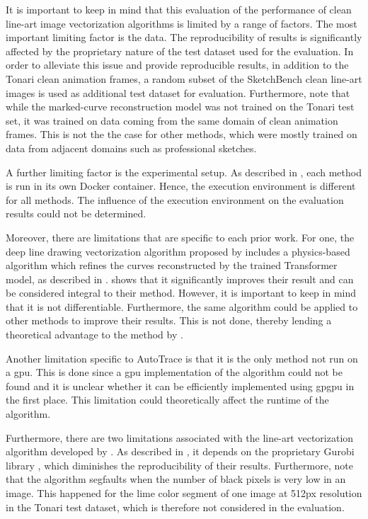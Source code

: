 It is important to keep in mind that this evaluation of the performance of clean line-art image vectorization algorithms is limited by a range of factors. The most important limiting factor is the data. The reproducibility of results is significantly affected by the proprietary nature of the test dataset used for the evaluation. In order to alleviate this issue and provide reproducible results, in addition to the Tonari clean animation frames, a random subset of the SketchBench \citep{Yan:2020:ABR} clean line-art images is used as additional test dataset for evaluation. Furthermore, note that while the marked-curve reconstruction model was not trained on the Tonari test set, it was trained on data coming from the same domain of clean animation frames. This is not the the case for other methods, which were mostly trained on data from adjacent domains such as professional sketches.

A further limiting factor is the experimental setup. As described in , each method is run in its own Docker container. Hence, the execution environment is different for all methods. The influence of the execution environment on the evaluation results could not be determined.

Moreover, there are limitations that are specific to each prior work. For one, the deep line drawing vectorization algorithm proposed by \citet{DBLP:conf/eccv/EgiazarianVAVST20} includes a physics-based algorithm which refines the curves reconstructed by the trained Transformer \citep{DBLP:conf/nips/VaswaniSPUJGKP17} model, as described in .  shows that it significantly improves their result and can be considered integral to their method. However, it is important to keep in mind that it is not differentiable. Furthermore, the same algorithm could be applied to other methods to improve their results. This is not done, thereby lending a theoretical advantage to the method by \citet{DBLP:conf/eccv/EgiazarianVAVST20}.

Another limitation specific to AutoTrace \citep{autotrace} is that it is the only method not run on a \gls{gpu}. This is done since a \gls{gpu} implementation of the algorithm could not be found and it is unclear whether it can be efficiently implemented using \gls{gpgpu} in the first place. This limitation could theoretically affect the runtime of the algorithm.

Furthermore, there are two limitations associated with the line-art vectorization algorithm developed by \citet{Puhachov2021KeypointPolyvector}. As described in , it depends on the proprietary Gurobi library \citep{gurobi}, which diminishes the reproducibility of their results. Furthermore, note that the algorithm segfaults when the number of black pixels is very low in an image. This happened for the lime color segment of one image at 512px resolution in the Tonari test dataset, which is therefore not considered in the evaluation.

